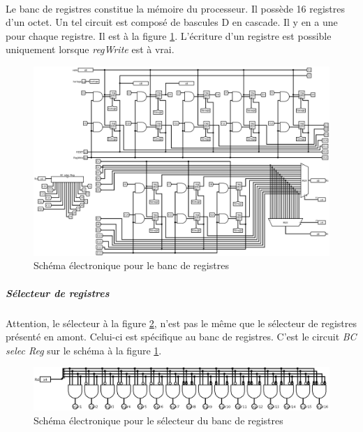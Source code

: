 \paragraph{}{
	Le banc de registres constitue la mémoire du processeur. Il possède
	16 registres d'un octet. Un tel circuit	est composé de bascules
	D en cascade. Il y en a une pour chaque registre. Il est à la figure
	\ref{banc_reg_circ}. \newline
	L'écriture d'un registre est possible uniquement lorsque \textit{regWrite}
	est à vrai.
}

\begin{figure}
	\centering
	\includegraphics[scale=0.4,angle=90,origin=c]{circuits/banc_reg.png}
	\caption{
		\label{banc_reg_circ}
		Sch\'{e}ma \'{e}lectronique pour le banc de registres
	}
\end{figure}

	\subparagraph{Sélecteur de registres}{
		Attention, le sélecteur à la figure \ref{banc_reg_selec_circ}, n'est
		pas le même que le sélecteur de registres présenté en amont.
		Celui-ci est spécifique au banc de registres. C'est le circuit
		\textit{BC selec Reg} sur le schéma à la figure \ref{banc_reg_circ}.
	}

\begin{figure}
	\centering
	\includegraphics[scale=0.3,origin=c]{circuits/banc_reg_selec.png}
	\caption{
		\label{banc_reg_selec_circ}
		Sch\'{e}ma \'{e}lectronique pour le sélecteur du banc de registres
	}
\end{figure}